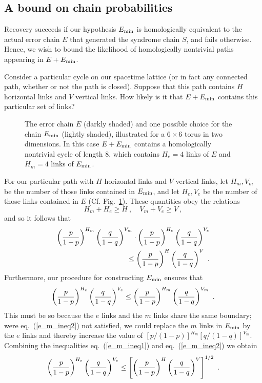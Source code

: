 \subsection{A bound on chain probabilities}
Recovery succeeds if our hypothesis $E_{\rm min}$ is homologically equivalent to the actual error chain $E$ that generated the syndrome chain $S$, and fails otherwise. Hence, we wish to bound the likelihood of
homologically nontrivial paths appearing in $E+E_{\rm min}$.

Consider a particular cycle on our spacetime lattice (or in fact any connected path, whether or not the path is closed). Suppose
that this path contains $H$ horizontal links and $V$ vertical links.
How likely is it that $E+E_{\rm min}$ contains this particular set of links?

\begin{figure}
\begin{center}
\leavevmode
\epsfxsize=3in
\end{center}
\caption{The error chain $E$ (darkly shaded) and one possible choice for the chain $E_{\rm min}$ (lightly shaded), illustrated for a $6\times 6$ torus in two dimensions. In this case $E+E_{\rm min}$ contains a homologically nontrivial cycle of length 8, which contains $H_e=4$ links of $E$ and $H_m=4$ links of $E_{\rm min}$.}
\label{fig:min_chain}
\end{figure}


For our particular path with $H$ horizontal links and $V$ vertical links, let
$H_m,V_m$ be the number of those links contained in $E_{\rm min}$, and let
$H_e,V_e$ be the number of those links contained in $E$ (Cf. Fig.~\ref{fig:min_chain}). These quantities obey the relations
\begin{equation}
H_m+H_e\ge H~,\quad V_m + V_e \ge V~,
\end{equation}
and so it follows that
\begin{eqnarray}
\label{e_m_ineq1}
\left({p\over 1-p}\right)^{H_m}\left({q\over 1-q}\right)^{V_m} \cdot \left({p\over 1-p}\right)^{H_e}\left({q\over 1-q}\right)^{V_e} \nonumber\\
\le \left({p\over 1-p}\right)^{H}\left({q\over 1-q}\right)^{V}~.
\end{eqnarray}
Furthermore, our procedure for constructing $E_{\rm min}$ ensures that
\begin{equation}
\label{e_m_ineq2}
\left({p\over 1-p}\right)^{H_e}\left({q\over 1-q}\right)^{V_e}\le \left({p\over 1-p}\right)^{H_m}\left({q\over 1-q}\right)^{V_m}  ~.
\end{equation}
This must be so because the $e$ links and the $m$ links share the same 
boundary; were eq.~(\ref{e_m_ineq2}) not satisfied, we could replace the $m$
links in $E_{\rm min}$ by the $e$ links and thereby increase the value of $[p/(1-p)]^{H_{m}}[q/(1-q)]^{V_{m}}$.  Combining the inequalities eq.~(\ref{e_m_ineq1}) and
eq.~(\ref{e_m_ineq2}) we obtain
\begin{equation}
\label{e_ineq}
\left({p\over 1-p}\right)^{H_e}\left({q\over 1-q}\right)^{V_e}\le \left[\left({p\over 1-p}\right)^{H}\left({q\over 1-q}\right)^{V}\right]^{1/2}  ~.
\end{equation}

